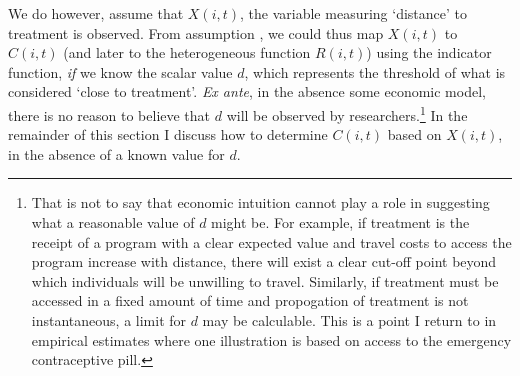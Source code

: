We do however, assume that $X(i,t)$, the variable measuring `distance' to 
treatment is observed. From assumption , we could thus map 
$X(i,t)$ to $C(i,t)$ (and later to the heterogeneous function $R(i,t)$) using the 
indicator function, \emph{if} we know the scalar value $d$, which represents the 
threshold of what is considered `close to treatment'. \emph{Ex ante}, in the 
absence some economic model, there is no reason to believe that $d$ will be 
observed by researchers.\footnote{That is not to say that economic intuition 
cannot play a role in suggesting what a reasonable value of $d$ might be. For 
example, if treatment is the receipt of a program with a clear expected value and 
travel costs to access the program increase with distance, there will exist a 
clear cut-off point beyond which individuals will be unwilling to travel. 
Similarly, if treatment must be accessed in a fixed amount of time and 
propogation of treatment is not instantaneous, a limit for $d$ may be calculable. 
This is a point I return to in empirical estimates where one illustration is 
based on access to the emergency contraceptive pill.}  In the remainder of this 
section I discuss how to determine $C(i,t)$ based on $X(i,t)$, in the absence of 
a known value for $d$.

